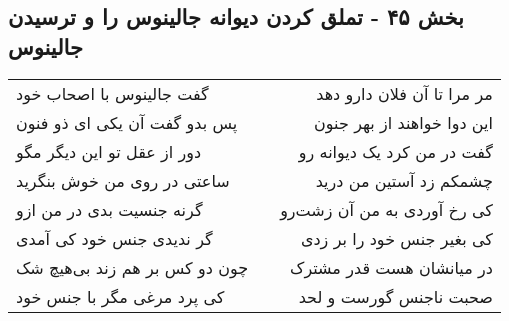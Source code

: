 \begin{center}
\section*{بخش ۴۵ - تملق کردن دیوانه جالینوس را و ترسیدن جالینوس}
\label{sec:sh045}
\begin{longtable}{l p{0.5cm} r}
گفت جالینوس با اصحاب خود
&&
مر مرا تا آن فلان دارو دهد
\\
پس بدو گفت آن یکی ای ذو فنون
&&
این دوا خواهند از بهر جنون
\\
دور از عقل تو این دیگر مگو
&&
گفت در من کرد یک دیوانه رو
\\
ساعتی در روی من خوش بنگرید
&&
چشمکم زد آستین من درید
\\
گرنه جنسیت بدی در من ازو
&&
کی رخ آوردی به من آن زشت‌رو
\\
گر ندیدی جنس خود کی آمدی
&&
کی بغیر جنس خود را بر زدی
\\
چون دو کس بر هم زند بی‌هیچ شک
&&
در میانشان هست قدر مشترک
\\
کی پرد مرغی مگر با جنس خود
&&
صحبت ناجنس گورست و لحد
\\
\end{longtable}
\end{center}
